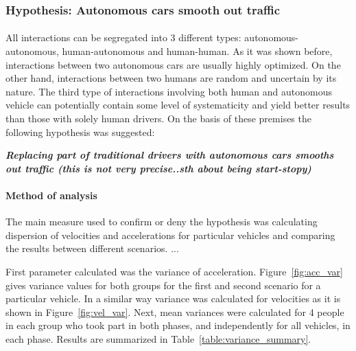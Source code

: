 \documentclass[11pt,english]{article}
\begin{document}
\subsubsection{Hypothesis: Autonomous cars smooth out traffic}
\paragraph{}
All interactions can be segregated into 3 different types: autonomous-autonomous, human-autonomous and human-human. As it was shown before, interactions between two autonomous cars are usually highly optimized. On the other hand, interactions between two humans are random and uncertain by its nature. The third type of interactions involving both human and autonomous vehicle can potentially contain some level of systematicity and yield better results than those with solely human drivers. On the basis of these premises the following hypothesis was suggested:

\textbf{\textit{Replacing part of traditional drivers with autonomous cars smooths out traffic (this is not very precise..sth about being start-stopy)}}

\paragraph{Method of analysis}
The main measure used to confirm or deny the hypothesis was calculating dispersion of velocities and accelerations for particular vehicles and comparing the results between different scenarios. ...\citep{dixon1957introduction}

First parameter calculated was the variance of acceleration. Figure~\ref{fig:acc_var} gives variance values for both groups for the first and second scenario for a particular vehicle. In a similar way variance was calculated for velocities as it is shown in Figure~\ref{fig:vel_var}. Next, mean variances were calculated for 4 people in each group who took part in both phases, and independently for all vehicles, in each phase. Results are summarized in Table~\ref{table:variance_summary}. 
 
\end{document}
